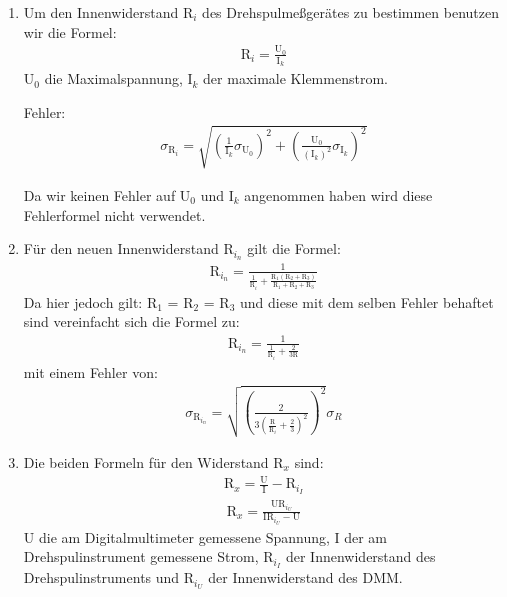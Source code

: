 \documentclass[12pt]{scrartcl}
\begin{document}
\begin{enumerate}

	\item
	Um den Innenwiderstand R$_i$ des 				Drehspulmeßgerätes zu bestimmen benutzen 	wir die Formel:
	\begin{align}
	\text{R}_{i}= \frac{\text{U}_0}					{\text{I}_k}
	\label{eqn:aufgabe_1}
	\end{align}
	U$_0$ die Maximalspannung, I$_k$ der maximale Klemmenstrom.
	
	Fehler:
	\begin{align}
	\sigma_{\text{R}_i} = 							\sqrt{\left(\frac{1}{\text{I}_k}\sigma_{\text{U}_0}\right)^2
	+\left(\frac{\text{U}_0}{(\text{I}_k)^2}\sigma_{\text{I}_k}\right)^2}
	\end{align}
	
	Da wir keinen Fehler auf U$_0$ und I$_k$ angenommen haben wird diese Fehlerformel nicht verwendet. 
	\item
	Für den neuen Innenwiderstand R$_{i_n}$ gilt die Formel:
	\begin{align}
	\text{R}_{i_n} = \frac{1}{\frac{1}{\text{R}_i}+\frac{\text{R}_1(\text{R}_2+
	\text{R}_3)}{\text{R}_1+\text{R}_2+\text{R}_3}}	
	\label{eqn:aufgabe_2}
	\end{align}
	Da hier jedoch gilt: R$_1$ = R$_2$ = R$_3$
	und diese mit dem selben Fehler behaftet sind vereinfacht sich die Formel zu:
	\begin{align}
	\text{R}_{i_n} = \frac{1}{\frac{1}{\text{R}_i}+\frac{2}{3\text{R}}}
	\end{align}
	mit einem Fehler von:
	\begin{align}
	\sigma_{\text{R}_{i_n}} = \sqrt{\left(\frac{2}{3\left(\frac{\text{R}}{\text{R}_i}+\frac{2}{3}\right)^2}\right)^2}\sigma_R
	\label{eqn:aufgabe_2_sigma}
	\end{align}
	\item
	Die beiden Formeln für den Widerstand 			R$_x$ sind:
	\begin{align}
	\text{R}_x=\frac{\text{U}}						{\text{I}}-\text{R}_{i_I}
	\label{eqn:aufgabe_3_schaltung_2}
	\end{align}
	\begin{align}
	\text{R}_x= 										\frac{\text{U}\text{R}_{i_U}}					{\text{I}\text{R}_{i_U}-\text{U}}
	\label{eqn:aufgabe_3_schaltung_1}
	\end{align}
	U die am Digitalmultimeter gemessene 			Spannung, I der am Drehspulinstrument 			gemessene Strom, R$_{i_I}$ der 					Innenwiderstand des Drehspulinstruments 			und R$_{i_U}$ der Innenwiderstand des DMM.
	

\end{enumerate}
\end{document}
